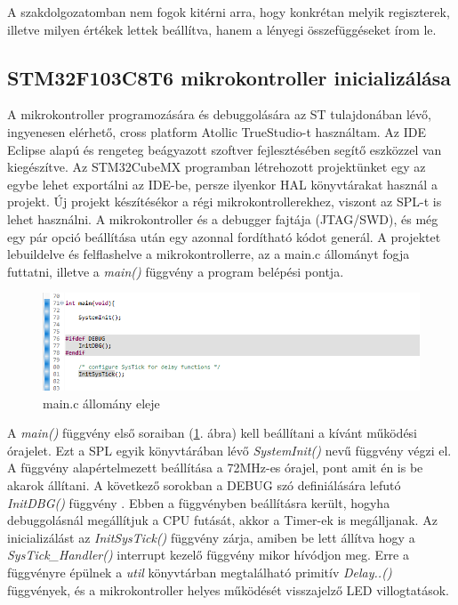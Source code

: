 \documentclass[../main.tex]{subfiles}
\begin{document}
        A szakdolgozatomban nem fogok kitérni arra, hogy konkrétan melyik regiszterek, illetve milyen értékek lettek beállítva, hanem a lényegi összefüggéseket írom le.
    
    \subsection{STM32F103C8T6 mikrokontroller inicializálása}
        A mikrokontroller programozására és debuggolására az ST tulajdonában lévő, ingyenesen elérhető, cross platform Atollic TrueStudio-t használtam. Az IDE Eclipse alapú és rengeteg beágyazott szoftver fejlesztésében segítő eszközzel van kiegészítve. Az STM32CubeMX programban létrehozott projektünket egy az egybe lehet exportálni az IDE-be, persze ilyenkor HAL könyvtárakat használ a projekt.
        Új projekt készítésékor a régi mikrokontrollerekhez, viszont az SPL-t is lehet használni. A mikrokontroller és a debugger fajtája (JTAG/SWD), és még egy pár opció beállítása után egy azonnal fordítható kódot generál.
        A projektet lebuildelve és felflashelve a mikrokontrollerre, az a main.c állományt fogja futtatni, illetve a \textit{main()} függvény a program belépési pontja.
        
        \begin{figure}[h!]
            \centering
                \includegraphics[width=13cm]{resources/mbed_res/ps_main_init.png}
                \caption{main.c állomány eleje}
                \label{fig:ps_main_init}
        \end{figure}
        
        A \textit{main()} függvény első soraiban (\ref{fig:ps_main_init}. ábra) kell beállítani a kívánt működési órajelet. Ezt a SPL egyik könyvtárában lévő \textit{SystemInit()} nevű függvény végzi el. A függvény alapértelmezett beállítása a 72MHz-es órajel, pont amit én is be akarok állítani. A következő sorokban a DEBUG szó definiálására lefutó \textit{InitDBG()} függvény \cite{peter_vass}. Ebben a függvényben beállításra került, hogyha debuggolásnál megállítjuk a CPU futását, akkor a Timer-ek is megálljanak. Az inicializálást az \textit{InitSysTick()} függvény zárja, amiben be lett állítva hogy a \textit{SysTick_Handler()} interrupt kezelő függvény mikor hívódjon meg. Erre a függvényre épülnek a \textit{util} könyvtárban megtalálható primitív \textit{Delay..()} függvények, és a mikrokontroller helyes működését visszajelző LED villogtatások.
       
\end{document}

